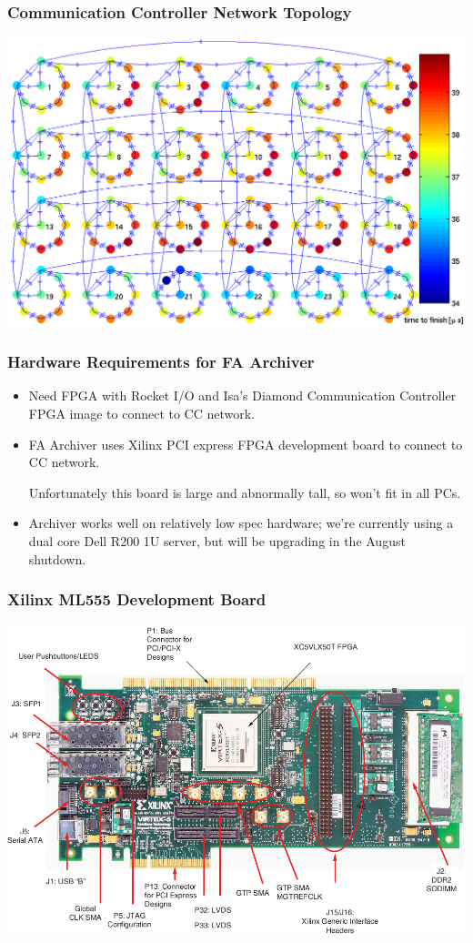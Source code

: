 \documentclass{beamer}
\begin{document}
\begin{frame}\frametitle{Communication Controller Network Topology}
\includegraphics[width=\linewidth]{fofb}
\end{frame}



\begin{frame}\frametitle{Hardware Requirements for FA Archiver}
\begin{itemize}

\item Need FPGA with Rocket I/O and Isa's Diamond Communication Controller FPGA
image to connect to CC network.

\item FA Archiver uses Xilinx PCI express FPGA development board to connect to
CC network.

\vspace{2pt}
Unfortunately this board is large and abnormally tall, so won't fit in all PCs.

\item Archiver works well on relatively low spec hardware; we're currently using
a dual core Dell R200 1U server, but will be upgrading in the August shutdown.

\end{itemize}
\end{frame}


\begin{frame}\frametitle{Xilinx ML555 Development Board}
\includegraphics[width=\linewidth]{ml555}
\end{frame}
\end{document}
